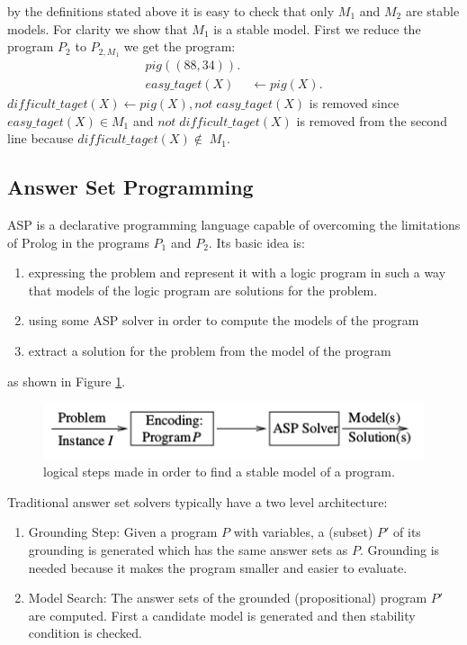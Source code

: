 by the definitions stated above it is easy to check that only \(M_1\) and \(M_2\) are stable models. For clarity we show that \(M_1\) is a stable model. First we reduce the program \(P_2\) to \(P_{2,M_1}\) we get the program:
\begin{align}
pig((88,34)).& \\
easy\_taget(X) &\leftarrow pig(X). 
\end{align}
\(difficult\_taget(X) \leftarrow pig(X), not\; easy\_taget(X) \) is removed since \(easy\_taget(X) \in M_1\) and \(not\; difficult\_taget(X)\) is removed from the second line because \(difficult\_taget(X) \notin\; M_1\).
\subsection{Answer Set Programming}

ASP \cite{} is a declarative programming language capable of overcoming the limitations of Prolog in the programs \(P_1\) and \(P_2\). Its basic idea is:
\begin{enumerate}
\item expressing the problem and represent it with a logic program in such a way that models of the logic program are solutions for the problem.
\item using some ASP solver in order to compute the models of the program
\item extract a solution for the problem from the model of the program
\end{enumerate}
as shown in Figure \ref{fig:ASP1}.
\begin{figure}
  \includegraphics[width=\linewidth]{f1.png}
  \caption{logical steps made in order to find a stable model of a program.}
  \label{fig:ASP1}
\end{figure}
 
Traditional answer set solvers typically have a two level architecture:
\begin{enumerate}
\item Grounding Step: Given a program \(P\) with variables, a (subset) \(P'\) of its grounding is generated which has the same answer sets as \(P\). Grounding is needed because it makes the program smaller and easier to evaluate.
\item Model Search: The answer sets of the grounded (propositional) program \(P'\) are computed. First a candidate model is generated and then stability condition is checked.
\end{enumerate}

